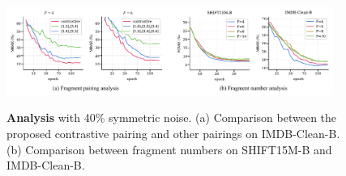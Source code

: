 \documentclass{article}
\theoremstyle{plain}
\theoremstyle{definition}
\theoremstyle{remark}
\begin{document}

\begin{figure}[t]
    \begin{center}
    \centerline{\includegraphics[width=0.95\textwidth]{imgs/discussion_figure_neurips_v2.pdf}}
    \vskip -0.1in
    \caption{
    \textbf{Analysis} with 40\% symmetric noise. (a) Comparison between the proposed contrastive pairing  and other pairings on IMDB-Clean-B.
    (b) Comparison between fragment numbers on SHIFT15M-B and IMDB-Clean-B.
    }
    \vskip -0.3in
    \label{fig:discussion_main}
    \end{center}
    \end{figure}
    
\end{document}
